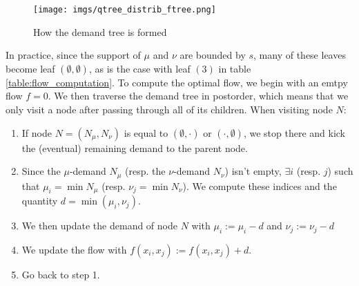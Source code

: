 \documentclass[11pt]{article}
\begin{document}
\begin{figure}[h]
\centering
\texttt{[image: imgs/qtree\_distrib\_ftree.png]}
\caption{How the demand tree is formed}
\label{qtree_distrib_ftree}
\end{figure}

In practice, since the support of $\mu$ and $\nu$ are bounded by $s$, 
many of these leaves become leaf $(\emptyset, \emptyset)$, 
as is the case with leaf $(3)$ in table \ref{table:flow_computation}. 
To compute the optimal flow, we begin with an emtpy flow $f=0$. We then traverse the demand tree in postorder, which means that we only visit a node after passing through all of its children. When visiting node $N$:

\begin{enumerate}[topsep=0pt,itemsep=-1ex,partopsep=1ex,parsep=1ex]

\item If node $N = (N_\mu, N_\nu)$ is equal to $(\emptyset, \cdot)$ or $(\cdot, \emptyset)$, we stop there and kick the (eventual) remaining demand to the parent node.

\item Since the $\mu$-demand $N_\mu$ (resp. the $\nu$-demand $N_\nu$) isn't empty, $\exists i$ (resp. $j$) such that $\mu_i = \min N_\mu$ (resp. $\nu_j = \min N_\nu$). We compute these indices and the quantity $d = \min (\mu_i, \nu_j)$.

\item We then update the demand of node $N$ with $\mu_i := \mu_i - d$ and $\nu_j := \nu_j - d$ 

\item We update the flow with $f(x_i, x_j) := f(x_i, x_j) + d$.

\item Go back to step 1.

\end{enumerate}
\end{document}
